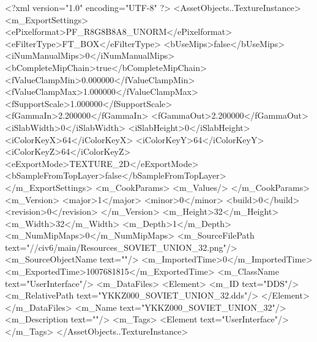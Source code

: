<?xml version="1.0" encoding="UTF-8" ?>
<AssetObjects..TextureInstance>
	<m_ExportSettings>
		<ePixelformat>PF_R8G8B8A8_UNORM</ePixelformat>
		<eFilterType>FT_BOX</eFilterType>
		<bUseMips>false</bUseMips>
		<iNumManualMips>0</iNumManualMips>
		<bCompleteMipChain>true</bCompleteMipChain>
		<fValueClampMin>0.000000</fValueClampMin>
		<fValueClampMax>1.000000</fValueClampMax>
		<fSupportScale>1.000000</fSupportScale>
		<fGammaIn>2.200000</fGammaIn>
		<fGammaOut>2.200000</fGammaOut>
		<iSlabWidth>0</iSlabWidth>
		<iSlabHeight>0</iSlabHeight>
		<iColorKeyX>64</iColorKeyX>
		<iColorKeyY>64</iColorKeyY>
		<iColorKeyZ>64</iColorKeyZ>
		<eExportMode>TEXTURE_2D</eExportMode>
		<bSampleFromTopLayer>false</bSampleFromTopLayer>
	</m_ExportSettings>
	<m_CookParams>
		<m_Values/>
	</m_CookParams>
	<m_Version>
		<major>1</major>
		<minor>0</minor>
		<build>0</build>
		<revision>0</revision>
	</m_Version>
	<m_Height>32</m_Height>
	<m_Width>32</m_Width>
	<m_Depth>1</m_Depth>
	<m_NumMipMaps>0</m_NumMipMaps>
	<m_SourceFilePath text="//civ6/main/Resources_SOVIET_UNION_32.png"/>
	<m_SourceObjectName text=""/>
	<m_ImportedTime>0</m_ImportedTime>
	<m_ExportedTime>1007681815</m_ExportedTime>
	<m_ClassName text="UserInterface"/>
	<m_DataFiles>
		<Element>
			<m_ID text="DDS"/>
			<m_RelativePath text="YKKZ000_SOVIET_UNION_32.dds"/>
		</Element>
	</m_DataFiles>
	<m_Name text="YKKZ000_SOVIET_UNION_32"/>
	<m_Description text=""/>
	<m_Tags>
		<Element text="UserInterface"/>
	</m_Tags>
</AssetObjects..TextureInstance>

